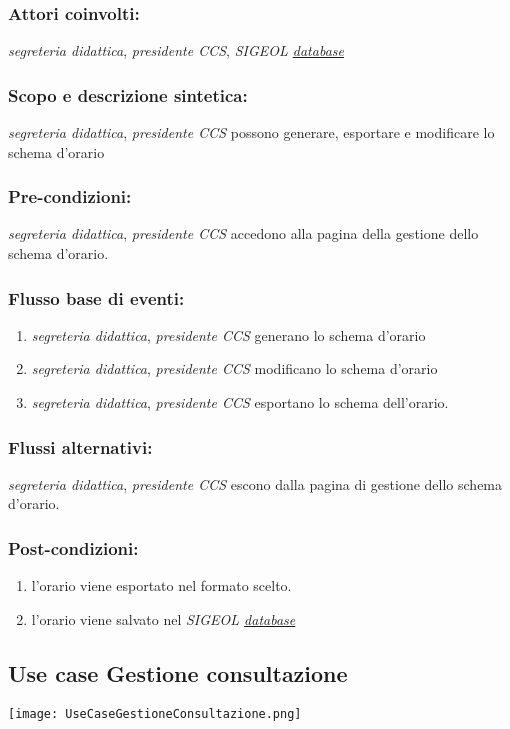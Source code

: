 \documentclass[11pt,a4paper]{article}
\begin{document}
\subsubsection*{Attori coinvolti:}
\textit{segreteria didattica}, \textit{presidente CCS}, \textit{SIGEOL \underline{database}}
\subsubsection*{Scopo e descrizione sintetica:}
\textit{segreteria didattica}, \textit{presidente CCS} possono generare, esportare e modificare lo schema d'orario
\subsubsection*{Pre-condizioni:}
\textit{segreteria didattica}, \textit{presidente CCS} accedono alla pagina della gestione dello schema d'orario.
\subsubsection*{Flusso base di eventi:}
\begin{enumerate} 
 \item \textit{segreteria didattica}, \textit{presidente CCS} generano lo schema d'orario
 \item \textit{segreteria didattica}, \textit{presidente CCS} modificano lo schema d'orario
 \item \textit{segreteria didattica}, \textit{presidente CCS} esportano lo schema dell'orario.
\end{enumerate}
\subsubsection*{Flussi alternativi:}
 \textit{segreteria didattica}, \textit{presidente CCS} escono dalla pagina di gestione dello schema d'orario.
\subsubsection*{Post-condizioni:}
\begin{enumerate}
 \item l'orario viene esportato nel formato scelto.
 \item l'orario viene salvato nel \textit{SIGEOL \underline{database}}
\end{enumerate}  

\subsection{Use case Gestione consultazione}
\begin{center} 
 \texttt{[image: UseCaseGestioneConsultazione.png]}
\end{center}
\end{document}
